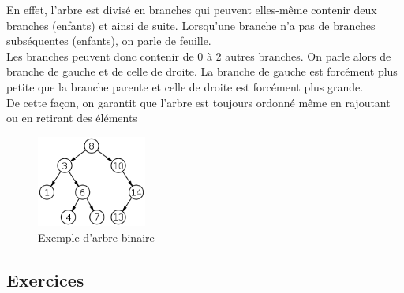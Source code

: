     En effet, l'arbre est divisé en branches qui peuvent elles-même contenir deux branches (enfants) et ainsi de suite. Lorsqu'une branche n'a pas de branches subséquentes (enfants), on parle de feuille.\\
    
    Les branches peuvent donc contenir de 0 à 2 autres branches. On parle alors de branche de gauche et de celle de droite. La branche de gauche est forcément plus petite que la branche parente et celle de droite est forcément plus grande.\\
    
    De cette façon, on garantit que l'arbre est toujours ordonné même en rajoutant ou en retirant des éléments\\
    
    \begin{figure}[h]
        \centering
        \includegraphics[width=0.32\textwidth]{img/binary-search-tree.png}
        \caption{Exemple d'arbre binaire}
    \end{figure}
    
    \subsection{Exercices}
    
